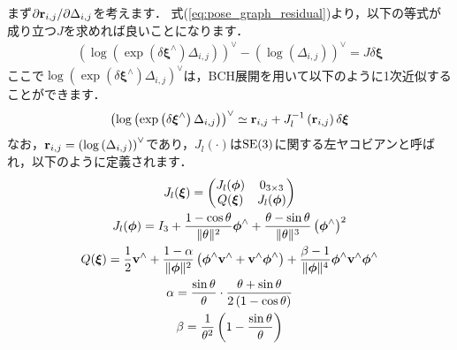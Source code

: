 まず$\partial {\bf r}_{i, j} / \partial \Delta_{i, j}$を考えます．
式(\ref{eq:pose_graph_residual})より，以下の等式が成り立つ$J$を求めれば良いことになります．
%
\begin{align}
  \left( \log \left( \exp \left( \delta \boldsymbol \xi^{\wedge} \right) \Delta_{i, j} \right) \right)^{\vee} - \left( \log \left( \Delta_{i, j} \right) \right)^{\vee} = J \delta \boldsymbol \xi
  \label{eq:deij_dDeltaij_J_deltaxi}
\end{align}
%
ここで$\log \left( \exp \left( \delta \boldsymbol \xi^{\wedge} \right) \Delta_{i, j} \right)^{\vee}$は，BCH展開を用いて以下のように1次近似することができます．
%
\begin{align}
  \left( \log \left( \exp \left( \delta \boldsymbol \xi^{\wedge} \right) \Delta_{i, j} \right) \right)^{\vee}
  \simeq {\bf r}_{i, j} + J_{l}^{-1} \left( {\bf r}_{i, j} \right) \delta \boldsymbol \xi
  \label{eq:bch_1_order_approx}
\end{align}
%
なお，${\bf r}_{i, j} = \left( \log \left( \Delta_{i, j} \right) \right)^{\vee}$であり，$J_{l}( \cdot )$は${\rm SE}(3)$に関する左ヤコビアンと呼ばれ，以下のように定義されます．
%
\begin{align}
  \begin{gathered}
    J_{l}( \boldsymbol \xi )
    = \left( \begin{matrix}
        J_{l}( \boldsymbol \phi ) & 0_{3 \times 3} \\
        Q( \boldsymbol \xi )      & J_{l}( \boldsymbol \phi ) \\
      \end{matrix} \right) \\
%
    J_{l}( \boldsymbol \phi ) = I_{3}
                              + \frac{ 1 - \cos \theta }{ \| \theta \|^{2} } \boldsymbol \phi^{\wedge}
                              + \frac{ \theta - \sin \theta }{ \| \theta \|^{3} } \left( \boldsymbol \phi^{\wedge} \right)^{2} \\
%
    Q( \boldsymbol \xi ) = \frac{1}{2} {\bf v}^{\wedge}
                         + \frac{1 - \alpha}{ \|\boldsymbol \phi \|^{2} } \left( \boldsymbol \phi^{\wedge} {\bf v}^{\wedge} + {\bf v}^{\wedge} \boldsymbol \phi^{\wedge} \right)
                         + \frac{\beta - 1}{ \|\boldsymbol \phi \|^{4} } \boldsymbol \phi^{\wedge} {\bf v}^{\wedge} \boldsymbol \phi^{\wedge} \\
%
    \alpha = \frac{ \sin \theta }{ \theta } \cdot \frac{ \theta + \sin \theta }{ 2 \left( 1 - \cos \theta \right) } \\
%
    \beta = \frac{1}{ \theta^{2} } \left( 1 - \frac{ \sin \theta }{ \theta } \right)
  \end{gathered}
  \label{eq:left_jacobian_se3}
\end{align}
